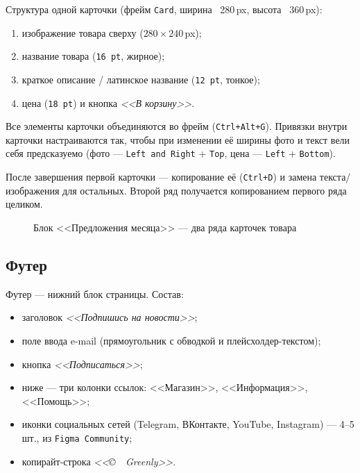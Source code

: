 Структура одной карточки (фрейм \texttt{Card}, ширина ~280\,px,
высота ~360\,px):
\begin{enumerate}
  \item изображение товара сверху (\(280\times240\,\)px);
  \item название товара (\texttt{16\,pt}, жирное);
  \item краткое описание / латинское название (\texttt{12\,pt},
        тонкое);
  \item цена (\texttt{18\,pt}) и кнопка \textit{<<В корзину>>}.
\end{enumerate}
Все элементы карточки объединяются во фрейм
(\texttt{Ctrl+Alt+G}). Привязки внутри карточки настраиваются так,
чтобы при изменении её ширины фото и текст вели себя предсказуемо
(фото --- \texttt{Left~and~Right} + \texttt{Top}, цена --- \texttt{Left}
+ \texttt{Bottom}).

После завершения первой карточки --- копирование её
(\texttt{Ctrl+D}) и замена текста/изображения для остальных. Второй
ряд получается копированием первого ряда целиком.

\begin{figure}[h]
  \centering
  \caption{Блок <<Предложения месяца>> --- два ряда карточек товара}
  \label{fig:offers}
\end{figure}

\subsection{Футер}

Футер --- нижний блок страницы. Состав:
\begin{itemize}
  \item заголовок \textit{<<Подпишись на новости>>};
  \item поле ввода e-mail (прямоугольник с обводкой и плейсхолдер-текстом);
  \item кнопка \textit{<<Подписаться>>};
  \item ниже --- три колонки ссылок: <<Магазин>>, <<Информация>>,
        <<Помощь>>;
  \item иконки социальных сетей (Telegram, ВКонтакте, YouTube,
        Instagram) --- 4--5 шт., из \texttt{Figma~Community};
  \item копирайт-строка \textit{<<\copyright~\cfgYear~Greenly>>}.
\end{itemize}


